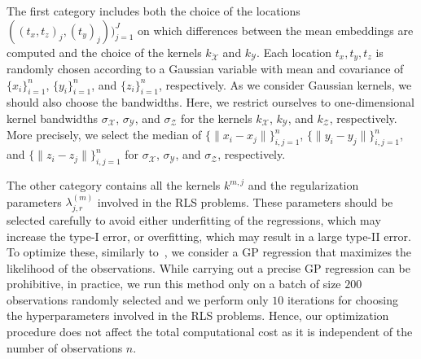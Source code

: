 The first category includes both the choice of the locations $((t_x,t_z)_j,(t_y)_j))_{j=1}^J$ on which differences between the mean embeddings are computed and the choice of the kernels $k_{\mathcal{\ddot{X}}}$ and $k_{\mathcal{Y}}$. Each location $t_x,t_y,t_z$  is randomly chosen according to a Gaussian variable with mean and covariance of $\{x_i\}_{i=1}^n$, $\{y_i\}_{i=1}^n$, and $\{z_i\}_{i=1}^n$, respectively. As we consider Gaussian kernels, we should also choose the bandwidths. Here, we restrict ourselves to one-dimensional kernel bandwidths $\sigma_{\mathcal{{X}}}$, $\sigma_{\mathcal{{Y}}}$, and $\sigma_{\mathcal{{Z}}}$ for the kernels $k_{\mathcal{X}}$, $k_{\mathcal{Y}}$, and $k_{\mathcal{Z}}$, respectively. More precisely, we select the median of $\{\lVert x_i-x_j\rVert\}_{i,j=1}^n$, $\{\lVert y_i-y_j\rVert\}_{i,j=1}^n$, and $\{\lVert z_i-z_j\rVert\}_{i,j=1}^n$ for $\sigma_{\mathcal{X}}$, $\sigma_{\mathcal{Y}}$,  and $\sigma_{\mathcal{Z}}$, respectively.


The other category contains all the kernels $k^{m,j}$ and the regularization parameters $\lambda^{(m)}_{j,r}$ involved in the RLS problems. These parameters should be selected carefully to avoid either underfitting of the regressions, which may increase the type-I error, or overfitting, which may result in a large type-II error. To optimize these, similarly to~\cite{zhang2012kernel}, we consider a GP regression that maximizes the likelihood of the observations. While carrying out a precise GP regression can be prohibitive, in practice, we run this method only on a batch of size $200$ observations randomly selected and we perform only $10$ iterations for choosing the hyperparameters involved in the RLS problems. Hence, our optimization procedure does not affect the total computational cost as it is independent of the number of observations $n$. 

